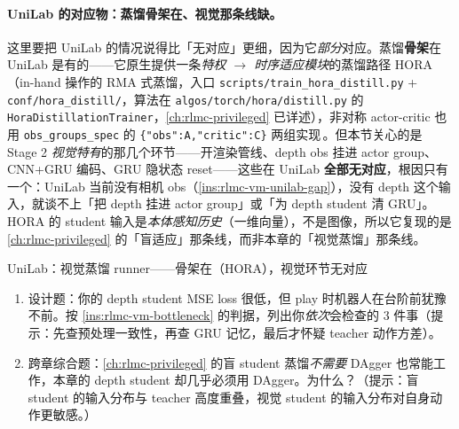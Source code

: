 \paragraph{UniLab 的对应物：蒸馏骨架在、视觉那条线缺。}这里要把 UniLab 的情况说得比「无对应」更细，因为它\emph{部分}对应。蒸馏\textbf{骨架}在 UniLab 是有的——它原生提供一条\emph{特权 $\to$ 时序适应模块}的蒸馏路径 HORA（in-hand 操作的 RMA 式蒸馏，入口 \verb|scripts/train_hora_distill.py| + \verb|conf/hora_distill/|，算法在 \verb|algos/torch/hora/distill.py| 的 \verb|HoraDistillationTrainer|，\cref{ch:rlmc-privileged} 已详述），非对称 actor-critic 也用 \verb|obs_groups_spec| 的 \verb|{"obs":A,"critic":C}| 两组实现\,\cite{unilab2026}。但本节关心的是 Stage 2 \emph{视觉特有}的那几个环节——开渲染管线、depth obs 挂进 actor group、CNN+GRU 编码、GRU 隐状态 reset——这些在 UniLab \textbf{全部无对应}，根因只有一个：UniLab 当前没有相机 obs（\cref{ins:rlmc-vm-unilab-gap}），没有 depth 这个输入，就谈不上「把 depth 挂进 actor group」或「为 depth student 清 GRU」。HORA 的 student 输入是\emph{本体感知历史}（一维向量），不是图像，所以它复现的是 \cref{ch:rlmc-privileged} 的「盲适应」那条线，而非本章的「视觉蒸馏」那条线。

\begin{codebox}[text]{UniLab：视觉蒸馏 runner——骨架在（HORA），视觉环节无对应}
\end{codebox}

\begin{practice}[视觉蒸馏的诊断思维]
\begin{enumerate}
\item 设计题：你的 depth student MSE loss 很低，但 play 时机器人在台阶前犹豫不前。按 \cref{ins:rlmc-vm-bottleneck} 的判据，列出你\emph{依次}会检查的 3 件事（提示：先查预处理一致性，再查 GRU 记忆，最后才怀疑 teacher 动作方差）。
\item 跨章综合题：\cref{ch:rlmc-privileged} 的盲 student 蒸馏\emph{不需要} DAgger 也常能工作，本章的 depth student 却几乎必须用 DAgger。为什么？（提示：盲 student 的输入分布与 teacher 高度重叠，视觉 student 的输入分布对自身动作更敏感。）
\end{enumerate}
\end{practice}

